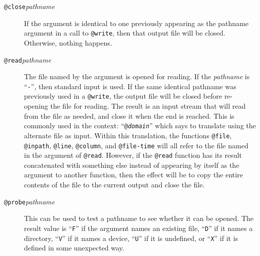 \begin{description}
\item[{\tt @close\ttlb}{\it pathname}{\tt \ttrb}]
If the argument is identical to one previously appearing as the pathname
argument in a call to
\verb/@write/, then that output file will be closed.
Otherwise, nothing happens.

\item[{\tt @read\ttlb}{\it pathname}{\tt \ttrb}]
The file named by the argument is opened for reading.  If the {\it
pathname} is ``\verb/-/'', then standard input is used.
If the same identical pathname was previously used in a \verb/@write/,
the output file will be closed before re-opening the file for reading.
The result is an input stream that will read from the file as needed,
and close it when the end is reached.
This is commonly used in the context:
``{\tt @{\it domain}\ttlb@read{}\ttrb\ttrb}''
which says to translate using the alternate file
as input.  Within this translation, the functions \verb/@file/,
\verb/@inpath/, \verb/@line/, \verb/@column/, and \verb/@file-time/ will
all refer to the file named in the argument of \verb/@read/.
However, if the \verb/@read/ function has its result concatenated with
something else instead of appearing by itself as the argument to another
function, then the effect will be to copy the entire contents of the
file to the current output and close the file.

\item[{\tt @probe\ttlb}{\it pathname}{\tt \ttrb}]
This can be used to test a pathname to see whether it can be opened.  The
result value is ``{\tt F}'' if the argument names an existing file,
``{\tt D}'' if it names a directory, ``{\tt V}'' if it names a device,
``{\tt U}'' if it is undefined, or ``{\tt X}'' if it is defined in some
unexpected way.
\end{description}

